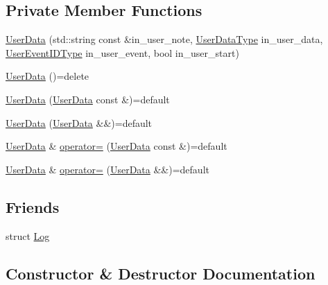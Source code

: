 \subsection*{Private Member Functions}
\begin{DoxyCompactItemize}
\item 
\hyperlink{structvt_1_1trace_1_1_log_1_1_data_1_1_user_data_af2033632789150e8ba193d61e3480168}{User\+Data} (std\+::string const \&in\+\_\+user\+\_\+note, \hyperlink{structvt_1_1trace_1_1_log_af392c3825bf45d286a0f77bddf7a96cf}{User\+Data\+Type} in\+\_\+user\+\_\+data, \hyperlink{namespacevt_1_1trace_a5908920d051c144c89f17c69ed262350}{User\+Event\+I\+D\+Type} in\+\_\+user\+\_\+event, bool in\+\_\+user\+\_\+start)
\item 
\hyperlink{structvt_1_1trace_1_1_log_1_1_data_1_1_user_data_a84fcb7ee8c663b8d97092b18f1b9d67b}{User\+Data} ()=delete
\item 
\hyperlink{structvt_1_1trace_1_1_log_1_1_data_1_1_user_data_a6773521e1beab14097cfdd43c921751f}{User\+Data} (\hyperlink{structvt_1_1trace_1_1_log_1_1_data_1_1_user_data}{User\+Data} const \&)=default
\item 
\hyperlink{structvt_1_1trace_1_1_log_1_1_data_1_1_user_data_a1ca52ac6118f62e8a29d4439ce30c1d6}{User\+Data} (\hyperlink{structvt_1_1trace_1_1_log_1_1_data_1_1_user_data}{User\+Data} \&\&)=default
\item 
\hyperlink{structvt_1_1trace_1_1_log_1_1_data_1_1_user_data}{User\+Data} \& \hyperlink{structvt_1_1trace_1_1_log_1_1_data_1_1_user_data_aee2a851a8c15e65950f8724ae3b29ec6}{operator=} (\hyperlink{structvt_1_1trace_1_1_log_1_1_data_1_1_user_data}{User\+Data} const \&)=default
\item 
\hyperlink{structvt_1_1trace_1_1_log_1_1_data_1_1_user_data}{User\+Data} \& \hyperlink{structvt_1_1trace_1_1_log_1_1_data_1_1_user_data_af28757a8247d33ab89946fb728a5cc7f}{operator=} (\hyperlink{structvt_1_1trace_1_1_log_1_1_data_1_1_user_data}{User\+Data} \&\&)=default
\end{DoxyCompactItemize}
\subsection*{Friends}
\begin{DoxyCompactItemize}
\item 
struct \hyperlink{structvt_1_1trace_1_1_log_1_1_data_1_1_user_data_add132ae9df1b7ef820c8082c32b0f839}{Log}
\end{DoxyCompactItemize}


\subsection{Constructor \& Destructor Documentation}
\mbox{\label{structvt_1_1trace_1_1_log_1_1_data_1_1_user_data_af2033632789150e8ba193d61e3480168}} 
